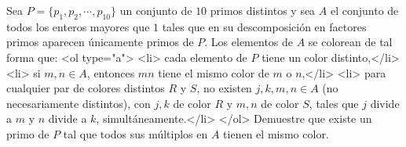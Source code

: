 Sea $P = \{ p_1, p_2, \cdots , p_{10}\}$ un conjunto de $10$ primos distintos y sea $A$ el conjunto de todos los enteros mayores que $1$ tales que en su descomposición en factores primos aparecen únicamente primos de $P$. Los elementos de $A$ se colorean de tal forma que:
<ol type="a">
  <li> cada elemento de $P$ tiene un color distinto,</li>
  <li> si $m,n \in A$, entonces $mn$ tiene el mismo color de $m$ o $n$,</li>
  <li> para cualquier par de colores distintos $R$ y $S$, no existen $j,k,m,n \in A$ (no necesariamente distintos), con $j,k$ de color $R$ y $m,n$ de color $S$, tales que $j$ divide a $m$ y $n$ divide a $k$, simultáneamente.</li>
 </ol>
 Demuestre que existe un primo de $P$ tal que todos sus múltiplos en $A$ tienen el mismo color.
